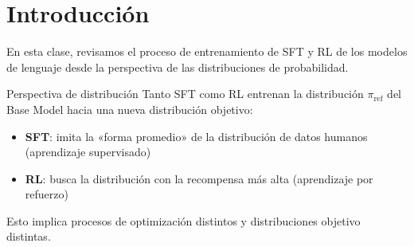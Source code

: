 \section{Introducción}
En esta clase, revisamos el proceso de entrenamiento de SFT y RL de los modelos de lenguaje desde la perspectiva de las distribuciones de probabilidad.

\begin{importantbox}{Perspectiva de distribución}
Tanto SFT como RL entrenan la distribución $\pi_{\text{ref}}$ del Base Model hacia una nueva distribución objetivo:
\begin{itemize}
  \item \textbf{SFT}: imita la «forma promedio» de la distribución de datos humanos (aprendizaje supervisado)
  \item \textbf{RL}: busca la distribución con la recompensa más alta (aprendizaje por refuerzo)
\end{itemize}
Esto implica procesos de optimización distintos y distribuciones objetivo distintas.
\end{importantbox}

